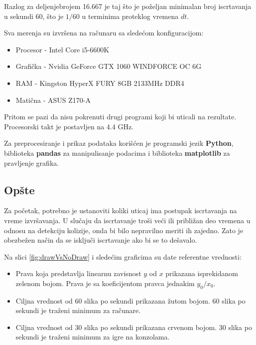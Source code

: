 \documentclass[12pt,oneside]{memoir}
\begin{document}
Razlog za deljenjebrojem 16.667 je taj što je poželjan minimalan broj iscrtavanja u sekundi 60, 
što je $1/60$ u terminima proteklog vremena $dt$.

Sva merenja su izvršena na računaru sa sledećom konfiguracijom:
\begin{itemize}  
	\item Procesor - Intel Core i5-6600K 
	\item Grafička - Nvidia GeForce GTX 1060 WINDFORCE OC 6G
	\item RAM - Kingston HyperX FURY 8GB 2133MHz DDR4 
	\item Matična - ASUS Z170-A
\end{itemize}  
Pritom se pazi da nisu pokrenuti drugi programi koji bi uticali na rezultate.
Procesorski takt je postavljen na 4.4 GHz.

Za preprocesiranje i prikaz podataka korišćen je programski jezik \textbf{Python},
biblioteka \textbf{pandas} za manipulisanje podacima i biblioteka \textbf{matplotlib}
za pravljenje grafika.

\subsection{Opšte}

Za početak, potrebno je ustanoviti koliki uticaj ima postupak iscrtavanja na vreme izvršavanja.
U slučaju da iscrtavanje troši veći ili približan deo vremena u odnosu na detekciju kolizije, onda 
bi bilo nepravilno meriti ih zajedno. Zato je obezbežen način da se isključi iscrtavanje ako bi se to dešavalo.


Na slici \ref{fig:drawVsNoDraw} i sledećim graficima su date referentne vrednosti:
\begin{itemize}  
	\item Prava koja predstavlja linearnu zavisnost $y$ od $x$ prikazana isprekidanom zelenom bojom.
	Prava je sa koeficijentom pravca jednakim $y_0/x_0$.
	\item Ciljna vrednost od 60 slika po sekundi prikazana žutom bojom.
	60 slika po sekundi je traženi minimum za računare.
	\item Ciljna vrednost od 30 slika po sekundi prikazana crvenom bojom.
	30 slika po sekundi je traženi minimum za igre na konzolama.
\end{itemize}  
\end{document}
